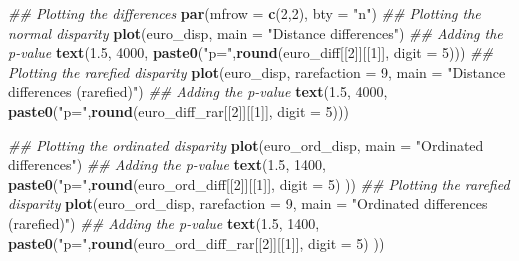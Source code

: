 \documentclass[]{book}
\newenvironment{Shaded}{\begin{snugshade}}{\end{snugshade}}
\newcommand{\CommentTok}[1]{\textcolor[rgb]{0.56,0.35,0.01}{\textit{#1}}}
\newcommand{\DataTypeTok}[1]{\textcolor[rgb]{0.13,0.29,0.53}{#1}}
\newcommand{\DecValTok}[1]{\textcolor[rgb]{0.00,0.00,0.81}{#1}}
\newcommand{\FloatTok}[1]{\textcolor[rgb]{0.00,0.00,0.81}{#1}}
\newcommand{\KeywordTok}[1]{\textcolor[rgb]{0.13,0.29,0.53}{\textbf{#1}}}
\newcommand{\NormalTok}[1]{#1}
\newcommand{\StringTok}[1]{\textcolor[rgb]{0.31,0.60,0.02}{#1}}
\begin{document}
\begin{Shaded}
\begin{Highlighting}[]
\CommentTok{## Plotting the differences}
\KeywordTok{par}\NormalTok{(}\DataTypeTok{mfrow =} \KeywordTok{c}\NormalTok{(}\DecValTok{2}\NormalTok{,}\DecValTok{2}\NormalTok{), }\DataTypeTok{bty =} \StringTok{"n"}\NormalTok{)}
\CommentTok{## Plotting the normal disparity}
\KeywordTok{plot}\NormalTok{(euro_disp, }\DataTypeTok{main =} \StringTok{"Distance differences"}\NormalTok{)}
\CommentTok{## Adding the p-value}
\KeywordTok{text}\NormalTok{(}\FloatTok{1.5}\NormalTok{, }\DecValTok{4000}\NormalTok{, }\KeywordTok{paste0}\NormalTok{(}\StringTok{"p="}\NormalTok{,}\KeywordTok{round}\NormalTok{(euro_diff[[}\DecValTok{2}\NormalTok{]][[}\DecValTok{1}\NormalTok{]], }\DataTypeTok{digit =} \DecValTok{5}\NormalTok{)))}
\CommentTok{## Plotting the rarefied disparity}
\KeywordTok{plot}\NormalTok{(euro_disp, }\DataTypeTok{rarefaction =} \DecValTok{9}\NormalTok{, }\DataTypeTok{main =} \StringTok{"Distance differences (rarefied)"}\NormalTok{)}
\CommentTok{## Adding the p-value}
\KeywordTok{text}\NormalTok{(}\FloatTok{1.5}\NormalTok{, }\DecValTok{4000}\NormalTok{, }\KeywordTok{paste0}\NormalTok{(}\StringTok{"p="}\NormalTok{,}\KeywordTok{round}\NormalTok{(euro_diff_rar[[}\DecValTok{2}\NormalTok{]][[}\DecValTok{1}\NormalTok{]], }\DataTypeTok{digit =} \DecValTok{5}\NormalTok{)))}

\CommentTok{## Plotting the ordinated disparity}
\KeywordTok{plot}\NormalTok{(euro_ord_disp, }\DataTypeTok{main =} \StringTok{"Ordinated differences"}\NormalTok{)}
\CommentTok{## Adding the p-value}
\KeywordTok{text}\NormalTok{(}\FloatTok{1.5}\NormalTok{, }\DecValTok{1400}\NormalTok{, }\KeywordTok{paste0}\NormalTok{(}\StringTok{"p="}\NormalTok{,}\KeywordTok{round}\NormalTok{(euro_ord_diff[[}\DecValTok{2}\NormalTok{]][[}\DecValTok{1}\NormalTok{]], }\DataTypeTok{digit =} \DecValTok{5}\NormalTok{) ))}
\CommentTok{## Plotting the rarefied disparity}
\KeywordTok{plot}\NormalTok{(euro_ord_disp, }\DataTypeTok{rarefaction =} \DecValTok{9}\NormalTok{, }\DataTypeTok{main =} \StringTok{"Ordinated differences (rarefied)"}\NormalTok{)}
\CommentTok{## Adding the p-value}
\KeywordTok{text}\NormalTok{(}\FloatTok{1.5}\NormalTok{, }\DecValTok{1400}\NormalTok{, }\KeywordTok{paste0}\NormalTok{(}\StringTok{"p="}\NormalTok{,}\KeywordTok{round}\NormalTok{(euro_ord_diff_rar[[}\DecValTok{2}\NormalTok{]][[}\DecValTok{1}\NormalTok{]], }\DataTypeTok{digit =} \DecValTok{5}\NormalTok{) ))}
\end{Highlighting}
\end{Shaded}
\end{document}
